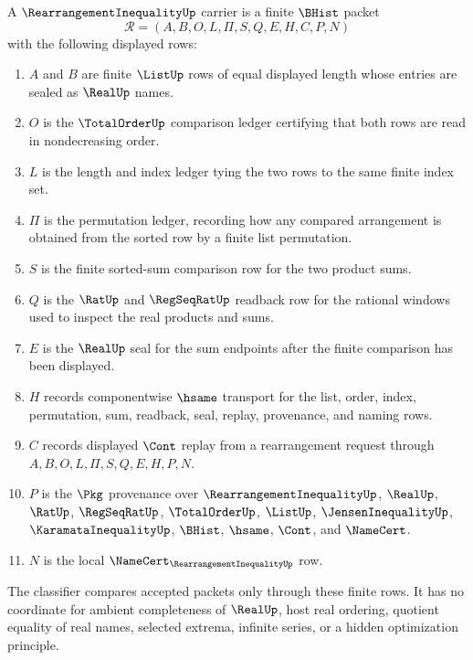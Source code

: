 \begin{definition}
\label{def:rearrangement-inequality-carrier}
A $\RearrangementInequalityUp$ carrier is a finite $\BHist$ packet
$$
\mathcal{R}=(A,B,O,L,\Pi,S,Q,E,H,C,P,N)
$$
with the following displayed rows:
\begin{enumerate}
\item $A$ and $B$ are finite $\ListUp$ rows of equal displayed length whose entries are sealed as $\RealUp$ names.
\item $O$ is the $\TotalOrderUp$ comparison ledger certifying that both rows are read in nondecreasing order.
\item $L$ is the length and index ledger tying the two rows to the same finite index set.
\item $\Pi$ is the permutation ledger, recording how any compared arrangement is obtained from the sorted row by a finite list permutation.
\item $S$ is the finite sorted-sum comparison row for the two product sums.
\item $Q$ is the $\RatUp$ and $\RegSeqRatUp$ readback row for the rational windows used to inspect the real products and sums.
\item $E$ is the $\RealUp$ seal for the sum endpoints after the finite comparison has been displayed.
\item $H$ records componentwise $\hsame$ transport for the list, order, index, permutation, sum, readback, seal, replay, provenance, and naming rows.
\item $C$ records displayed $\Cont$ replay from a rearrangement request through $A,B,O,L,\Pi,S,Q,E,H,P,N$.
\item $P$ is the $\Pkg$ provenance over $\RearrangementInequalityUp$, $\RealUp$, $\RatUp$, $\RegSeqRatUp$, $\TotalOrderUp$, $\ListUp$, $\JensenInequalityUp$, $\KaramataInequalityUp$, $\BHist$, $\hsame$, $\Cont$, and $\NameCert$.
\item $N$ is the local $\NameCert_{\RearrangementInequalityUp}$ row.
\end{enumerate}
The classifier compares accepted packets only through these finite rows. It has no coordinate for ambient completeness of $\RealUp$, host real ordering, quotient equality of real names, selected extrema, infinite series, or a hidden optimization principle.
\end{definition}

